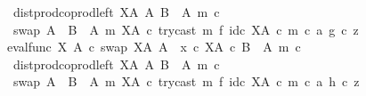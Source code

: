 \begin{isabellebody}
\ \ \ \ \ \ \ \ \ \ \ \ dist{\isacharunderscore}{\kern0pt}prod{\isacharunderscore}{\kern0pt}coprod{\isacharunderscore}{\kern0pt}left\ {\isacharparenleft}{\kern0pt}X\isactrlbsup A\isactrlesup {\isacharparenright}{\kern0pt}\ A\ {\isacharparenleft}{\kern0pt}B\ {\isasymsetminus}\ {\isacharparenleft}{\kern0pt}A{\isacharcomma}{\kern0pt}\ m{\isacharparenright}{\kern0pt}{\isacharparenright}{\kern0pt}\ {\isasymcirc}\isactrlsub c\isanewline
\ \ \ \ \ \ \ \ \ \ \ \ swap\ {\isacharparenleft}{\kern0pt}A\ {\isasymCoprod}\ {\isacharparenleft}{\kern0pt}B\ {\isasymsetminus}\ {\isacharparenleft}{\kern0pt}A{\isacharcomma}{\kern0pt}\ m{\isacharparenright}{\kern0pt}{\isacharparenright}{\kern0pt}{\isacharparenright}{\kern0pt}\ {\isacharparenleft}{\kern0pt}X\isactrlbsup A\isactrlesup {\isacharparenright}{\kern0pt}\ {\isasymcirc}\isactrlsub c\ try{\isacharunderscore}{\kern0pt}cast\ m\ {\isasymtimes}\isactrlsub f\ id\isactrlsub c\ {\isacharparenleft}{\kern0pt}X\isactrlbsup A\isactrlesup {\isacharparenright}{\kern0pt}{\isacharparenright}{\kern0pt}\ {\isasymcirc}\isactrlsub c\ {\isasymlangle}m\ {\isasymcirc}\isactrlsub c\ a{\isacharcomma}{\kern0pt}\ g\ {\isasymcirc}\isactrlsub c\ z{\isasymrangle}\isanewline
\ \ \ \ \ \ \ \ \ \ {\isacharequal}{\kern0pt}\ {\isacharparenleft}{\kern0pt}{\isacharparenleft}{\kern0pt}eval{\isacharunderscore}{\kern0pt}func\ X\ A\ {\isasymcirc}\isactrlsub c\ swap\ {\isacharparenleft}{\kern0pt}X\isactrlbsup A\isactrlesup {\isacharparenright}{\kern0pt}\ A{\isacharparenright}{\kern0pt}\ {\isasymamalg}\ {\isacharparenleft}{\kern0pt}x\ {\isasymcirc}\isactrlsub c\ {\isasymbeta}\isactrlbsub X\isactrlbsup A\isactrlesup \ {\isasymtimes}\isactrlsub c\ {\isacharparenleft}{\kern0pt}B\ {\isasymsetminus}\ {\isacharparenleft}{\kern0pt}A{\isacharcomma}{\kern0pt}\ m{\isacharparenright}{\kern0pt}{\isacharparenright}{\kern0pt}\isactrlesub {\isacharparenright}{\kern0pt}\ {\isasymcirc}\isactrlsub c\isanewline
\ \ \ \ \ \ \ \ \ \ \ \ dist{\isacharunderscore}{\kern0pt}prod{\isacharunderscore}{\kern0pt}coprod{\isacharunderscore}{\kern0pt}left\ {\isacharparenleft}{\kern0pt}X\isactrlbsup A\isactrlesup {\isacharparenright}{\kern0pt}\ A\ {\isacharparenleft}{\kern0pt}B\ {\isasymsetminus}\ {\isacharparenleft}{\kern0pt}A{\isacharcomma}{\kern0pt}\ m{\isacharparenright}{\kern0pt}{\isacharparenright}{\kern0pt}\ {\isasymcirc}\isactrlsub c\isanewline
\ \ \ \ \ \ \ \ \ \ \ \ swap\ {\isacharparenleft}{\kern0pt}A\ {\isasymCoprod}\ {\isacharparenleft}{\kern0pt}B\ {\isasymsetminus}\ {\isacharparenleft}{\kern0pt}A{\isacharcomma}{\kern0pt}\ m{\isacharparenright}{\kern0pt}{\isacharparenright}{\kern0pt}{\isacharparenright}{\kern0pt}\ {\isacharparenleft}{\kern0pt}X\isactrlbsup A\isactrlesup {\isacharparenright}{\kern0pt}\ {\isasymcirc}\isactrlsub c\ try{\isacharunderscore}{\kern0pt}cast\ m\ {\isasymtimes}\isactrlsub f\ id\isactrlsub c\ {\isacharparenleft}{\kern0pt}X\isactrlbsup A\isactrlesup {\isacharparenright}{\kern0pt}{\isacharparenright}{\kern0pt}\ {\isasymcirc}\isactrlsub c\ {\isasymlangle}m\ {\isasymcirc}\isactrlsub c\ a{\isacharcomma}{\kern0pt}\ h\ {\isasymcirc}\isactrlsub c\ z{\isasymrangle}{\isachardoublequoteclose}\isanewline

\end{isabellebody}
